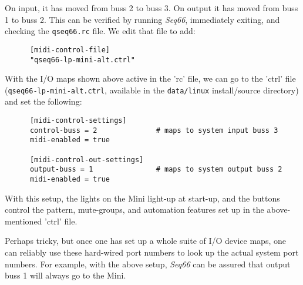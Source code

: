    On input, it has moved from buss 2 to buss 3.
   On output it has moved from buss 1 to buss 2.
   This can be verified by running \textsl{Seq66}, immediately exiting,
   and checking the \texttt{qseq66.rc} file.
   We edit that file to add:

   \begin{verbatim}
      [midi-control-file]
      "qseq66-lp-mini-alt.ctrl"
   \end{verbatim}

   With the I/O maps shown above active in the 'rc' file,
   we can go to the 'ctrl' file (\texttt{qseq66-lp-mini-alt.ctrl}, available in
   the \texttt{data/linux} install/source directory)
   and set the following:

   \begin{verbatim}
      [midi-control-settings]
      control-buss = 2              # maps to system input buss 3
      midi-enabled = true

      [midi-control-out-settings]
      output-buss = 1               # maps to system output buss 2
      midi-enabled = true
   \end{verbatim}

   With this setup, the lights on the Mini light-up at start-up, and the
   buttons control the pattern, mute-groups, and automation features set up in
   the above-mentioned 'ctrl' file.

   Perhaps tricky, but once one has set up a whole suite of I/O device maps,
   one can reliably use these hard-wired port numbers to look up the actual
   system port numbers.  For example, with the above setup, \textsl{Seq66} can
   be assured that output buss 1 will always go to the Mini.

